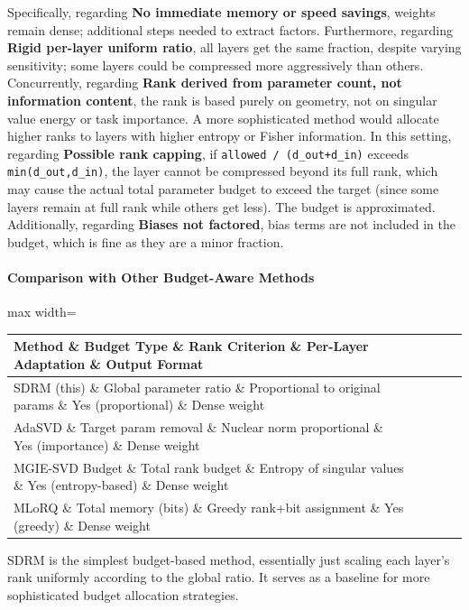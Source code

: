 Specifically, regarding \textbf{No immediate memory or speed savings}, weights remain dense; additional steps needed to extract factors. Furthermore, regarding \textbf{Rigid per-layer uniform ratio}, all layers get the same fraction, despite varying sensitivity; some layers could be compressed more aggressively than others. Concurrently, regarding \textbf{Rank derived from parameter count, not information content}, the rank is based purely on geometry, not on singular value energy or task importance. A more sophisticated method would allocate higher ranks to layers with higher entropy or Fisher information. In this setting, regarding \textbf{Possible rank capping}, if \texttt{allowed / (d\_out+d\_in)} exceeds \texttt{min(d\_out,d\_in)}, the layer cannot be compressed beyond its full rank, which may cause the actual total parameter budget to exceed the target (since some layers remain at full rank while others get less). The budget is approximated. Additionally, regarding \textbf{Biases not factored}, bias terms are not included in the budget, which is fine as they are a minor fraction.


\paragraph{Comparison with Other Budget-Aware Methods}

\begin{center}
\begin{adjustbox}{max width=\columnwidth}
\renewcommand{\arraystretch}{1.2}
\begin{tabular}{lllll}
\toprule
Method \& Budget Type \& Rank Criterion \& Per-Layer Adaptation \& Output Format \\
\midrule
SDRM (this) \& Global parameter ratio \& Proportional to original params \& Yes (proportional) \& Dense weight \\
AdaSVD \& Target param removal \& Nuclear norm proportional \& Yes (importance) \& Dense weight \\
MGIE-SVD Budget \& Total rank budget \& Entropy of singular values \& Yes (entropy-based) \& Dense weight \\
MLoRQ \& Total memory (bits) \& Greedy rank+bit assignment \& Yes (greedy) \& Dense weight \\

\bottomrule
\end{tabular}
\end{adjustbox}
\end{center}
SDRM is the simplest budget-based method, essentially just scaling each layer's rank uniformly according to the global ratio. It serves as a baseline for more sophisticated budget allocation strategies.


